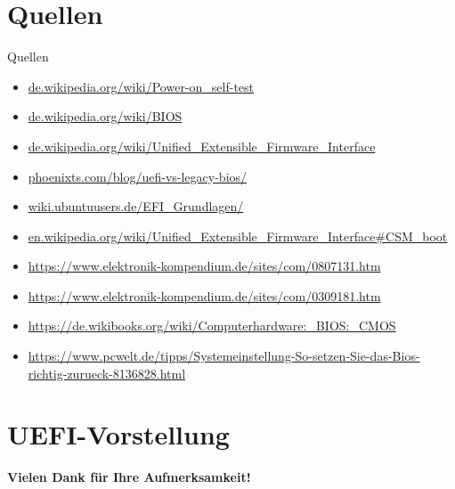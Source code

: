 \documentclass[9pt]{beamer}
\begin{document}
    \section{Quellen}
        \begin{frame}{Quellen}{}
            \begin{itemize}
                \item \href{https://de.wikipedia.org/wiki/Power-on_self-test}{de.wikipedia.org/wiki/Power-on\_{}self-test}
                \item \href{https://de.wikipedia.org/wiki/BIOS}{de.wikipedia.org/wiki/BIOS}
                \item \href{https://de.wikipedia.org/wiki/Unified_Extensible_Firmware_Interface}{de.wikipedia.org/wiki/Unified\_{}Extensible\_{}Firmware\_{}Interface}
                \item \href{https://phoenixts.com/blog/uefi-vs-legacy-bios/}{phoenixts.com/blog/uefi-vs-legacy-bios/}
                \item \href{https://wiki.ubuntuusers.de/EFI_Grundlagen/}{wiki.ubuntuusers.de/EFI\_{}Grundlagen/}
                \item \href{https://en.wikipedia.org/wiki/Unified_Extensible_Firmware_Interface\#CSM_booting}{en.wikipedia.org/wiki/Unified\_{}Extensible\_{}Firmware\_{}Interface\#{}CSM\_{}boot}
                \item \href{https://www.elektronik-kompendium.de/sites/com/0807131.htm}{https://www.elektronik-kompendium.de/sites/com/0807131.htm}
                \item \href{https://www.elektronik-kompendium.de/sites/com/0309181.htm}{https://www.elektronik-kompendium.de/sites/com/0309181.htm}
                \item \href{https://de.wikibooks.org/wiki/Computerhardware:_BIOS:_CMOS}{https://de.wikibooks.org/wiki/Computerhardware:\_{}BIOS:\_{}CMOS}
                \item \href{https://www.pcwelt.de/tipps/Systemeinstellung-So-setzen-Sie-das-Bios-richtig-zurueck-8136828.html}{https://www.pcwelt.de/tipps/Systemeinstellung-So-setzen-Sie-das-Bios-richtig-zurueck-8136828.html}
            \end{itemize}
        \end{frame}
    \section{UEFI-Vorstellung}
    
    \begin{frame}[plain]
            \begin{center}
                \huge\textbf{Vielen Dank für Ihre Aufmerksamkeit!}
            \end{center}
        \end{frame}
\end{document}
